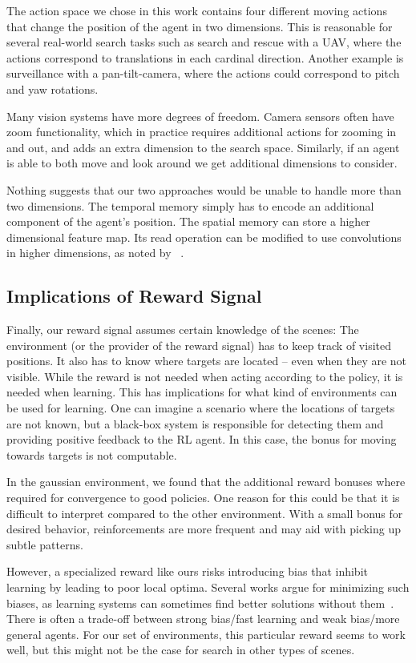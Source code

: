 The action space we chose in this work contains four different moving actions that change the position of the agent in two dimensions.
This is reasonable for several real-world search tasks such as search and rescue with a UAV, where the actions correspond to translations in each cardinal direction.
Another example is surveillance with a pan-tilt-camera, where the actions could correspond to pitch and yaw rotations.

Many vision systems have more degrees of freedom.
Camera sensors often have zoom functionality, which in practice requires additional actions for zooming in and out, and adds an extra dimension to the search space.
Similarly, if an agent is able to both move and look around we get additional dimensions to consider.

Nothing suggests that our two approaches would be unable to handle more than two dimensions.
The temporal memory simply has to encode an additional component of the agent's position.
The spatial memory can store a higher dimensional feature map.
Its read operation can be modified to use convolutions in higher dimensions, as noted by ~\cite{parisotto_neural_2017}.

\subsection{Implications of Reward Signal}

Finally, our reward signal assumes certain knowledge of the scenes:
The environment (or the provider of the reward signal) has to keep track of visited positions.
It also has to know where targets are located -- even when they are not visible.
While the reward is not needed when acting according to the policy, it is needed when learning.
This has implications for what kind of environments can be used for learning.
One can imagine a scenario where the locations of targets are not known, but a black-box system is responsible for detecting them and providing positive feedback to the RL agent.
In this case, the bonus for moving towards targets is not computable.

In the gaussian environment, we found that the additional reward bonuses where required for convergence to good policies.
One reason for this could be that it is difficult to interpret compared to the other environment.
With a small bonus for desired behavior, reinforcements are more frequent and may aid with picking up subtle patterns.

However, a specialized reward like ours risks introducing bias that inhibit learning by leading to poor local optima.
Several works argue for minimizing such biases, as learning systems can sometimes find better solutions without them~\cite{hessel_inductive_2019}.
There is often a trade-off between strong bias/fast learning and weak bias/more general agents.
For our set of environments, this particular reward seems to work well, but this might not be the case for search in other types of scenes.

